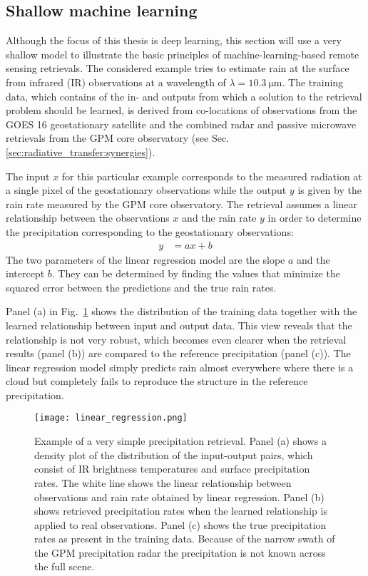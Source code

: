\subsection{Shallow machine learning}

Although the focus of this thesis is deep learning, this section will use a very
shallow model to illustrate the basic principles of machine-learning-based
remote sensing retrievals. The considered example tries to estimate rain at the
surface from infrared (IR) observations at a wavelength of $\lambda =
\SI{10.3}{\micro \meter}$. The training data, which contains of the in- and
outputs from which a solution to the retrieval problem should be learned, is
derived from co-locations of observations from the GOES 16 geostationary
satellite and the combined radar and passive microwave retrievals from the GPM
core observatory (see Sec. \ref{sec:radiative_transfer:synergies}).

The input $x$ for this particular example corresponds to the measured radiation
at a single pixel of the geostationary observations while the output $y$ is
given by the rain rate measured by the GPM core observatory. The retrieval
assumes a linear relationship between the observations $x$ and the rain rate $y$
in order to determine the precipitation corresponding to the geostationary
observations:
\begin{align}
  y &= a x + b
\end{align}
The two parameters of the linear regression model are the slope $a$ and 
the intercept $b$. They can be determined by finding the values that minimize the
squared error between the predictions and the true rain rates.

Panel (a) in Fig.~\ref{fig:machine_learning:linear_regression} shows the
distribution of the training data together with the learned relationship between
input and output data. This view reveals that the relationship is not very
robust, which becomes even clearer when the retrieval results (panel (b)) are
compared to the reference precipitation (panel (c)). The linear regression model
simply predicts rain almost everywhere where there is a cloud but completely
fails to reproduce the structure in the reference precipitation.

\begin{figure}
  \centering
  \texttt{[image: linear\_regression.png]}
  \caption{Example of a very simple precipitation retrieval. Panel (a) shows a
    density plot of the distribution of the input-output pairs, which consist of
    IR brightness temperatures and surface precipitation rates. The white line
    shows the linear relationship between observations and rain rate obtained by
    linear regression. Panel (b) shows retrieved precipitation rates when the
    learned relationship is applied to real observations. Panel (c) shows the
    true precipitation rates as present in the training data. Because of the
    narrow swath of the GPM precipitation radar the precipitation is not known
    across the full scene. }
  \label{fig:machine_learning:linear_regression}
\end{figure}

